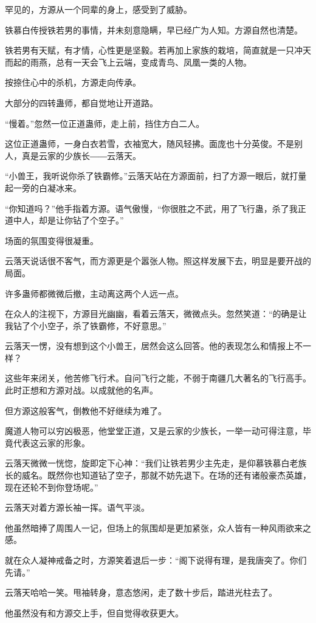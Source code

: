 \begin{this_body}
罕见的，方源从一个同辈的身上，感受到了威胁。

铁慕白传授铁若男的事情，并未刻意隐瞒，早已经广为人知。方源自然也清楚。

铁若男有天赋，有才情，心性更是坚毅。若再加上家族的栽培，简直就是一只冲天而起的雨燕，总有一天会飞上云端，变成青鸟、凤凰一类的人物。

按捺住心中的杀机，方源走向传承。

大部分的四转蛊师，都自觉地让开道路。

“慢着。”忽然一位正道蛊师，走上前，挡住方白二人。

这位正道蛊师，一身白衣若雪，衣袖宽大，随风轻拂。面庞也十分英俊。不是别人，真是云家的少族长――云落天。

“小兽王，我听说你杀了铁霸修。”云落天站在方源面前，扫了方源一眼后，就打量起一旁的白凝冰来。

“你知道吗？”他手指着方源。语气傲慢，“你很胜之不武，用了飞行蛊，杀了我正道中人，却是让你钻了个空子。”

场面的氛围变得很凝重。

云落天说话很不客气，而方源更是个嚣张人物。照这样发展下去，明显是要开战的局面。

许多蛊师都微微后撤，主动离这两个人远一点。

在众人的注视下，方源目光幽幽，看着云落天，微微点头。忽然笑道：“的确是让我钻了个小空子，杀了铁霸修，不好意思。”

云落天一愣，没有想到这个小兽王，居然会这么回答。他的表现怎么和情报上不一样？

这些年来闭关，他苦修飞行术。自问飞行之能，不弱于南疆几大著名的飞行高手。此时正想和方源对战。以成就他的名声。

但方源这般客气，倒教他不好继续为难了。

魔道人物可以穷凶极恶，他堂堂正道，又是云家的少族长，一举一动可得注意，毕竟代表这云家的形象。

云落天微微一恍惚，旋即定下心神：“我们让铁若男少主先走，是仰慕铁慕白老族长的威名。既然你也知道钻了空子，那就不妨先退下。在场的还有诸般豪杰英雄，现在还轮不到你登场呢。”

云落天对着方源长袖一挥。语气平淡。

他虽然暗捧了周围人一记，但场上的氛围却是更加紧张，众人皆有一种风雨欲来之感。

就在众人凝神戒备之时，方源笑着退后一步：“阁下说得有理，是我唐突了。你们先请。”

云落天哈哈一笑。甩袖转身，意态悠闲，走了数十步后，踏进光柱去了。

他虽然没有和方源交上手，但自觉得收获更大。


\end{this_body}
